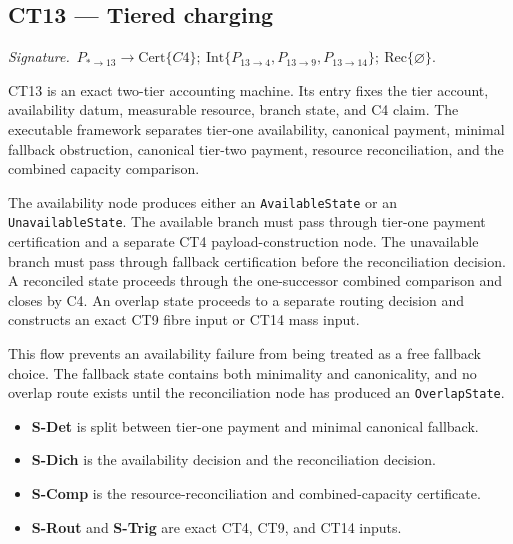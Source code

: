 \documentclass[
  11pt,
]{article}
\providecommand{\tightlist}{%
  \setlength{\itemsep}{0pt}\setlength{\parskip}{0pt}}
\theoremstyle{definition}
\newcommand{\ctsignature}[1]{\par\noindent\emph{Signature.}\ #1\par\medskip}
\newcommand{\ctcert}[1]{\mathrm{Cert}\{#1\}}
\newcommand{\ctint}[1]{\mathrm{Int}\{#1\}}
\newcommand{\ctrec}[1]{\mathrm{Rec}\{#1\}}
\newcommand{\ctnone}{\varnothing}
\begin{document}
\subsection{CT13 --- Tiered charging}\label{ct:13}\label{tiered-charging-scheme-failure-as-a-demand}
\ctsignature{\(P_{\ast\to13}\to \ctcert{C4};\ \ctint{P_{13\to4},P_{13\to9},P_{13\to14}};\ \ctrec{\ctnone}.\)}

CT13 is an exact two-tier accounting machine.  Its entry fixes the tier
account, availability datum, measurable resource, branch state, and C4 claim.
The executable framework separates tier-one availability, canonical payment,
minimal fallback obstruction, canonical tier-two payment, resource
reconciliation, and the combined capacity comparison.

The availability node produces either an \texttt{AvailableState} or an
\texttt{UnavailableState}.  The available branch must pass through tier-one
payment certification and a separate CT4 payload-construction node.  The
unavailable branch must pass through fallback certification before the
reconciliation decision.  A reconciled state proceeds through the one-successor
combined comparison and closes by C4.  An overlap state proceeds to a separate
routing decision and constructs an exact CT9 fibre input or CT14 mass input.

This flow prevents an availability failure from being treated as a free
fallback choice.  The fallback state contains both minimality and canonicality,
and no overlap route exists until the reconciliation node has produced an
\texttt{OverlapState}.

\begin{itemize}
\tightlist
\item \textbf{S-Det} is split between tier-one payment and minimal canonical fallback.
\item \textbf{S-Dich} is the availability decision and the reconciliation decision.
\item \textbf{S-Comp} is the resource-reconciliation and combined-capacity certificate.
\item \textbf{S-Rout} and \textbf{S-Trig} are exact CT4, CT9, and CT14 inputs.
\end{itemize}
\end{document}
